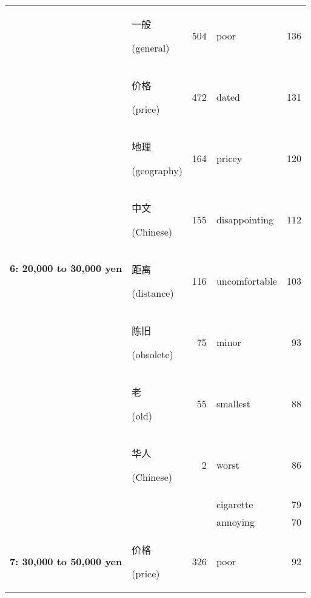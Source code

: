 \documentclass[smallextended,natbib]{svjour3}       %
\begin{document}
\begin{table}[ht]
{\begin{tabular}{|c|lr|lr|}
        \multirow{10}{*}{\textbf{6: 20,000 to 30,000 yen}}   & \begin{CJK}{UTF8}{gbsn}一般\end{CJK} (general)   & 504  & poor           & 136 \\  
                                                             & \begin{CJK}{UTF8}{gbsn}价格\end{CJK} (price)     & 472  & dated          & 131 \\  
                                                             & \begin{CJK}{UTF8}{gbsn}地理\end{CJK} (geography) & 164  & pricey         & 120 \\  
                                                             & \begin{CJK}{UTF8}{gbsn}中文\end{CJK} (Chinese)   & 155  & disappointing  & 112 \\  
                                                             & \begin{CJK}{UTF8}{gbsn}距离\end{CJK} (distance)  & 116  & uncomfortable  & 103 \\  
                                                             & \begin{CJK}{UTF8}{gbsn}陈旧\end{CJK} (obsolete)  & 75   & minor          & 93  \\  
                                                             & \begin{CJK}{UTF8}{gbsn}老\end{CJK} (old)        & 55   & smallest       & 88  \\  
                                                             & \begin{CJK}{UTF8}{gbsn}华人\end{CJK} (Chinese)   & 2    & worst          & 86  \\  
                                                             &                                                &      & cigarette      & 79  \\  
                                                             &                                                &      & annoying       & 70  \\ \hline
        \multirow{10}{*}{\textbf{7: 30,000 to 50,000 yen}}   & \begin{CJK}{UTF8}{gbsn}价格\end{CJK} (price)     & 326  & poor           & 92  \\  

\end{tabular}}
\end{table}
\end{document}
